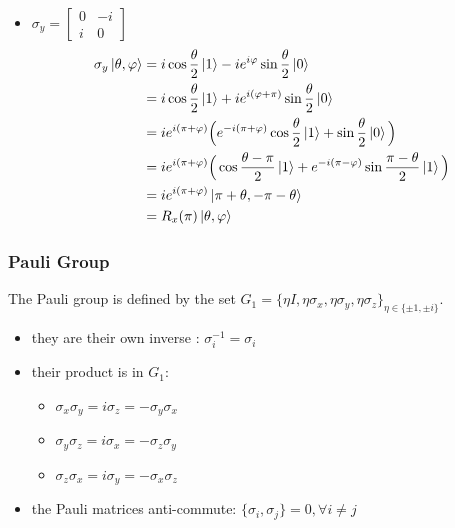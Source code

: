 \documentclass{article}
\begin{document}
\begin{itemize}[label=-]
    \item $\sigma_y = \begin{bmatrix} 0 & -i \\ i & 0 \end{bmatrix}$
    \begin{equation}
        \begin{aligned}
            \sigma_y\ket{\theta, \varphi}
                & = i\cos\frac{\theta}{2}\ket{1} - ie^{i\varphi}\sin\frac{\theta}{2}\ket{0} \\
                & = i\cos\frac{\theta}{2}\ket{1} + ie^{i(\varphi+\pi)}\sin\frac{\theta}{2}\ket{0}\\
                & = ie^{i(\pi+\varphi)}\Big(e^{-i(\pi+\varphi)}
                \cos\frac{\theta}{2}\ket{1}+\sin\frac{\theta}{2}\ket{0}\Big) \\
                & = ie^{i(\pi+\varphi)}\Big(\cos\frac{\theta-\pi}{2}
                \ket{1}+e^{-i(\pi-\varphi)}\sin\frac{\pi-\theta}{2}\ket{1}\Big) \\
                & = ie^{i(\pi+\varphi)}\ket{\pi+\theta, -\pi-\theta} \\
                & = R_x(\pi)\ket{\theta, \varphi}
        \end{aligned}
    \end{equation}

\end{itemize}


\subsubsection*{Pauli Group}
The Pauli group is defined by the set $G_1 = \{\eta I, \eta\sigma_x,
\eta\sigma_y, \eta\sigma_z\}_{\eta\in\{\pm 1, \pm i\}}$.
\begin{itemize}[label=-]
    \item they are their own inverse : $\sigma_i^{-1}=\sigma_i$
    \item their product is in $G_1$:
    \begin{itemize}
        \item $\sigma_x\sigma_y=i\sigma_z=-\sigma_y\sigma_x$
        \item $\sigma_y\sigma_z=i\sigma_x=-\sigma_z\sigma_y$
        \item $\sigma_z\sigma_x=i\sigma_y=-\sigma_x\sigma_z$
    \end{itemize}
    \item the Pauli matrices anti-commute: $\{\sigma_i, \sigma_j\} = 0, \forall
    i \neq j$
\end{itemize}
\end{document}
